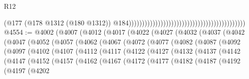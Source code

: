 \begin{lexlean}{R12}
\begin{coremodule}
                                                                                          (@177
                                                                                            (@178
                                                                                              @1312
                                                                                              (@180
                                                                                                @1312))
                                                                                            @184))))))))))))))))))))))))))))))))))))))))))))
@4554 := @4002
    (@4007
      (@4012
        (@4017
          (@4022
            (@4027
              (@4032
                (@4037
                  (@4042
                    (@4047
                      (@4052
                        (@4057
                          (@4062
                            (@4067
                              (@4072
                                (@4077
                                  (@4082
                                    (@4087
                                      (@4092
                                        (@4097
                                          (@4102
                                            (@4107
                                              (@4112
                                                (@4117
                                                  (@4122
                                                    (@4127
                                                      (@4132
                                                        (@4137
                                                          (@4142
                                                            (@4147
                                                              (@4152
                                                                (@4157
                                                                  (@4162
                                                                    (@4167
                                                                      (@4172
                                                                        (@4177
                                                                          (@4182
                                                                            (@4187
                                                                              (@4192
                                                                                (@4197
                                                                                  (@4202

\end{coremodule}
\end{lexlean}
